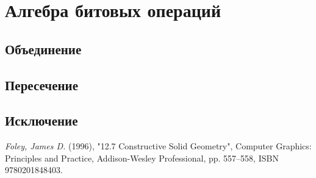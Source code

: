 \section{Алгебра битовых операций}

\subsection{Объединение}
\subsection{Пересечение}
\subsection{Исключение}

\newpage
\begin{thebibliography}{9}
     \textit{Foley, James D.} (1996), "12.7 Constructive Solid Geometry", Computer Graphics: Principles and Practice, Addison-Wesley Professional, pp. 557–558, ISBN 9780201848403.
\end{thebibliography}
